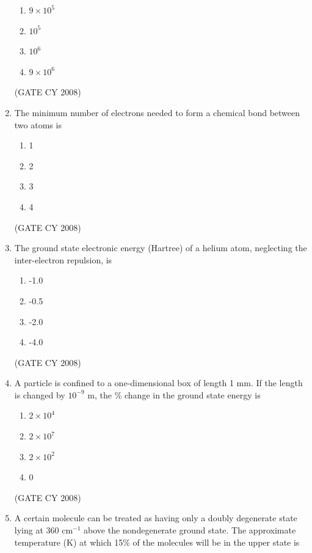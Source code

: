 \documentclass[12pt]{article}
\begin{document}
\begin{enumerate}
\begin{enumerate}
\item $9 \times 10^5$
\item $10^5$
\item $10^6$
\item $9 \times 10^6$
\end{enumerate}    \hfill{(GATE CY 2008)}




\item The minimum number of electrons needed to form a chemical bond between two atoms is

\begin{enumerate}
\item 1
\item 2
\item 3
\item 4
\end{enumerate}    \hfill{(GATE CY 2008)}




\item The ground state electronic energy (Hartree) of a helium atom, neglecting the inter-electron repulsion, is

\begin{enumerate}
\item -1.0
\item -0.5
\item -2.0
\item -4.0
\end{enumerate}    \hfill{(GATE CY 2008)}




\item A particle is confined to a one-dimensional box of length 1 mm. If the length is changed by $10^{-9}$ m, the \% change in the ground state energy is

\begin{enumerate}
\item $2 \times 10^4$
\item $2 \times 10^7$
\item $2 \times 10^2$
\item 0
\end{enumerate}    \hfill{(GATE CY 2008)}




\item A certain molecule can be treated as having only a doubly degenerate state lying at 360 cm$^{-1}$ above the nondegenerate ground state. The approximate temperature (K) at which 15\% of the molecules will be in the upper state is


\end{enumerate}
\end{document}
